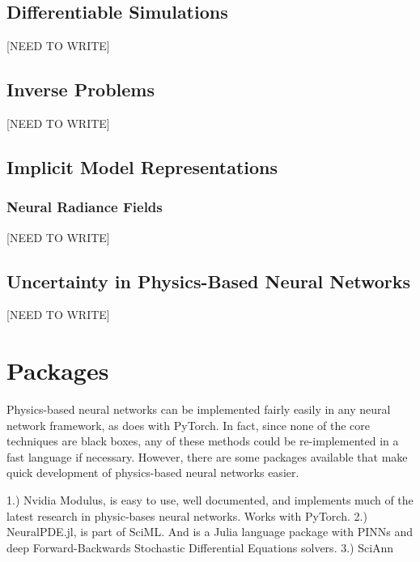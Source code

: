 \documentclass[]{article}
\begin{document}
\subsection{Differentiable Simulations}
[NEED TO WRITE]
\subsection{Inverse Problems}
[NEED TO WRITE]
\subsection{Implicit Model Representations}
\subsubsection{Neural Radiance Fields}
[NEED TO WRITE]
\subsection{Uncertainty in Physics-Based Neural Networks}
[NEED TO WRITE]

\section{Packages}
Physics-based neural networks can be implemented fairly easily in any neural network framework, as \cite{pbdl_book} does with PyTorch.  In fact, since none of the core techniques are black boxes, any of these methods could be re-implemented in a fast language if necessary.  However, there are some packages available that make quick development of physics-based neural networks easier. 

1.) Nvidia Modulus, \cite{nvidia_modulus} is easy to use, well documented, and implements much of the latest research in physic-bases neural networks.  Works with PyTorch.
2.) NeuralPDE.jl, \cite{zubov2021neuralpde} is part of SciML.  And is a Julia language package with PINNs and deep Forward-Backwards Stochastic Differential Equations solvers. 
3.) SciAnn





\end{document}
